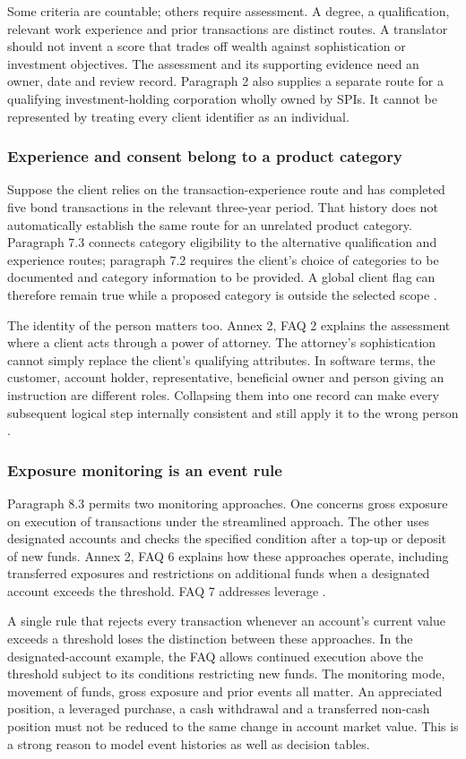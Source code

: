 \documentclass[12pt,a4paper,oneside,openany]{book}
\newcommand{\caseheading}[1]{\subsubsection*{#1}}
\begin{document}
Some criteria are countable; others require assessment. A degree, a qualification,
relevant work experience and prior transactions are distinct routes. A translator
should not invent a score that trades off wealth against sophistication or
investment objectives. The assessment and its supporting evidence need an owner,
date and review record. Paragraph 2 also supplies a separate route for a qualifying
investment-holding corporation wholly owned by SPIs. It cannot be represented by
treating every client identifier as an individual.

\caseheading{Experience and consent belong to a product category}
Suppose the client relies on the transaction-experience route and has completed
five bond transactions in the relevant three-year period. That history does not
automatically establish the same route for an unrelated product category.
Paragraph 7.3 connects category eligibility to the alternative qualification and
experience routes; paragraph 7.2 requires the client's choice of categories to be
documented and category information to be provided. A global client flag can
therefore remain true while a proposed category is outside the selected scope
\citep[Annex 1, paras.~4.1, 7.1--7.3]{sfcspiannex1}.

The identity of the person matters too. Annex 2, FAQ 2 explains the assessment
where a client acts through a power of attorney. The attorney's sophistication
cannot simply replace the client's qualifying attributes. In software terms,
the customer, account holder, representative, beneficial owner and person giving
an instruction are different roles. Collapsing them into one record can make
every subsequent logical step internally consistent and still apply it to the
wrong person \citep[Annex 2, FAQ 2]{sfcspiannex2}.

\caseheading{Exposure monitoring is an event rule}
Paragraph 8.3 permits two monitoring approaches. One concerns gross exposure on
execution of transactions under the streamlined approach. The other uses
designated accounts and checks the specified condition after a top-up or deposit
of new funds. Annex 2, FAQ 6 explains how these approaches operate, including
transferred exposures and restrictions on additional funds when a designated
account exceeds the threshold. FAQ 7 addresses leverage
\citep[Annex 1, para.~8.3; Annex 2, FAQs 6--7]{sfcspiannex1,sfcspiannex2}.

A single rule that rejects every transaction whenever an account's current value
exceeds a threshold loses the distinction between these approaches. In the
designated-account example, the FAQ allows continued execution above the
threshold subject to its conditions restricting new funds. The monitoring mode,
movement of funds, gross exposure and prior events all matter. An appreciated
position, a leveraged purchase, a cash withdrawal and a transferred non-cash
position must not be reduced to the same change in account market value. This is
a strong reason to model event histories as well as decision tables.
\end{document}
